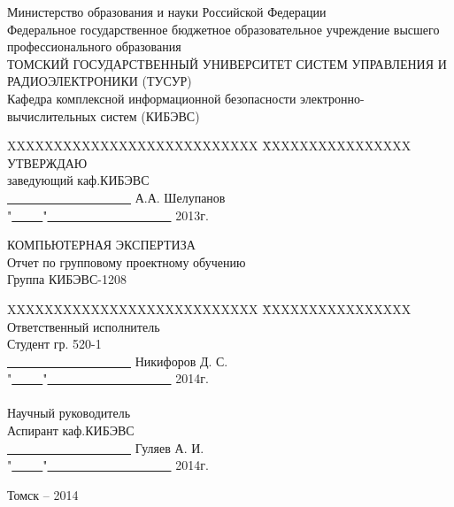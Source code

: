 \documentclass[russian,utf8,14pt,simple]{eskdtext}
\begin{document}
\newpage
{}

\begin{center}
Министерство образования и науки Российской Федерации\\
Федеральное государственное бюджетное образовательное учреждение высшего профессионального образования\\
ТОМСКИЙ ГОСУДАРСТВЕННЫЙ УНИВЕРСИТЕТ СИСТЕМ УПРАВЛЕНИЯ И РАДИОЭЛЕКТРОНИКИ (ТУСУР)\\
Кафедра комплексной информационной безопасности электронно-вычислительных систем (КИБЭВС)\\
\end{center}

\begin{tabbing}
XXXXXXXXXXXXXXXXXXXXXXXXXXX \=
XXXXXXXXXXXXXXXX\kill
\> УТВЕРЖДАЮ\\
\> заведующий каф.КИБЭВС\\
\> \underline{\ \ \ \ \ \ \ \ \ \ \ \ \ \ \ \ \ \ \ \ } А.А. Шелупанов\\
\> "\underline{\ \ \ \ \ }"\underline{\ \ \ \ \ \ \ \ \ \ \ \ \ \ \ \ \ \ \ \ } 2013г.\\
\end{tabbing}

\begin{center}
КОМПЬЮТЕРНАЯ ЭКСПЕРТИЗА\\
Отчет по групповому проектному обучению\\
Группа КИБЭВС-1208\\
\end{center}

\begin{tabbing}
XXXXXXXXXXXXXXXXXXXXXXXXXXX \=
XXXXXXXXXXXXXXXX\kill
\> Ответственный исполнитель\\
\> Студент гр. 520-1\\
\> \underline{\ \ \ \ \ \ \ \ \ \ \ \ \ \ \ \ \ \ \ \ } Никифоров Д. С.\\
\> "\underline{\ \ \ \ \ }"\underline{\ \ \ \ \ \ \ \ \ \ \ \ \ \ \ \ \ \ \ \ } 2014г.\\
\ \\
\> Научный руководитель\\
\> Аспирант каф.КИБЭВС\\
\> \underline{\ \ \ \ \ \ \ \ \ \ \ \ \ \ \ \ \ \ \ \ } Гуляев А. И.\\
\> "\underline{\ \ \ \ \ }"\underline{\ \ \ \ \ \ \ \ \ \ \ \ \ \ \ \ \ \ \ \ } 2014г.\\
\end{tabbing}
\vfill
\begin{center}
Томск -- 2014
\end{center}
\end{document}
